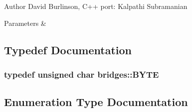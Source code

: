 \begin{DoxyAuthor}{Author}
David Burlinson, C++ port\+: Kalpathi Subramanian 
\end{DoxyAuthor}

\begin{DoxyParams}{Parameters}
{\em } & \\
\hline
\end{DoxyParams}


\subsection{Typedef Documentation}
\hypertarget{namespacebridges_a59b77ee45243ba85c701fb8ab298ef00}{}
\subsubsection[{B\+Y\+T\+E}]{\setlength{\rightskip}{0pt plus 5cm}typedef unsigned char {\bf bridges\+::\+B\+Y\+T\+E}}\label{namespacebridges_a59b77ee45243ba85c701fb8ab298ef00}


\subsection{Enumeration Type Documentation}
\hypertarget{namespacebridges_a1b4050586bd708782ae0d4f3b06b9579}{}
